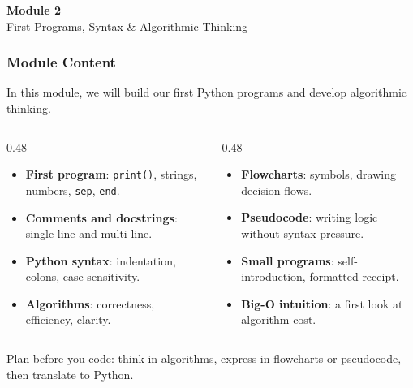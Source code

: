 \documentclass[aspectratio=169,10pt]{beamer}
\newcommand{\keyword}[1]{\textcolor{PrimaryBlue}{\textbf{#1}}}
\begin{document}
\begin{noheadline}
\begin{frame}
\vspace{1.35cm}
\begin{center}
  {\fontsize{30}{36}\selectfont\textbf{Module 2}}\\[0.35cm]
  {\fontsize{25}{30}\selectfont First Programs, Syntax \& Algorithmic Thinking}\\[0.7cm]
\end{center}
\end{frame}
\end{noheadline}


\begin{frame}[fragile]
\frametitle{Module Content}
\small
In this module, we will build our first Python programs and develop algorithmic thinking.

\vspace{0.18cm}
\begin{columns}[T,totalwidth=0.96\textwidth]
\begin{column}{0.48\textwidth}
\begin{itemize}\setlength\itemsep{0.05cm}
  \item \keyword{First program}: \texttt{print()}, strings, numbers, \texttt{sep}, \texttt{end}.
  \item \keyword{Comments and docstrings}: single-line and multi-line.
  \item \keyword{Python syntax}: indentation, colons, case sensitivity.
  \item \keyword{Algorithms}: correctness, efficiency, clarity.
\end{itemize}
\end{column}
\begin{column}{0.48\textwidth}
\begin{itemize}\setlength\itemsep{0.05cm}
  \item \keyword{Flowcharts}: symbols, drawing decision flows.
  \item \keyword{Pseudocode}: writing logic without syntax pressure.
  \item \keyword{Small programs}: self-introduction, formatted receipt.
  \item \keyword{Big-O intuition}: a first look at algorithm cost.
\end{itemize}
\end{column}
\end{columns}
\vspace{0.10cm}
\begin{tcolorbox}[lecturebox,title=Learning goal]
Plan before you code: think in algorithms, express in flowcharts or pseudocode, then translate to Python.
\end{tcolorbox}
\end{frame}
\end{document}
